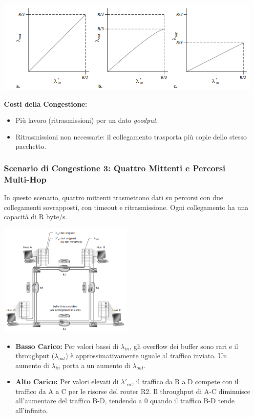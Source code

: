 \begin{center}
  \includegraphics[width=\textwidth]{img/scenario2diag.png}
\end{center}

\textbf{Costi della Congestione:}
\begin{itemize}
    \item Più lavoro (ritrasmissioni) per un dato \textit{goodput}.
    \item Ritrasmissioni non necessarie: il collegamento trasporta più copie dello stesso pacchetto.
\end{itemize}

\subsubsection*{Scenario di Congestione 3: Quattro Mittenti e Percorsi Multi-Hop}
In questo scenario, quattro mittenti trasmettono dati su percorsi con due collegamenti sovrapposti, con timeout e ritrasmissione. Ogni collegamento ha una capacità di R byte/s.

\begin{center}
  \includegraphics[width=0.5\textwidth]{img/scenario3.png}
\end{center}

\begin{itemize}
    \item \textbf{Basso Carico:} Per valori bassi di \(\lambda_{in}\), gli overflow dei buffer sono rari e il throughput (\(\lambda_{out}\)) è approssimativamente uguale al traffico inviato. Un aumento di \(\lambda_{in}\) porta a un aumento di \(\lambda_{out}\).
    \item \textbf{Alto Carico:} Per valori elevati di \(\lambda'_{in}\), il traffico da B a D compete con il traffico da A a C per le risorse del router R2. Il throughput di A-C diminuisce all'aumentare del traffico B-D, tendendo a 0 quando il traffico B-D tende all'infinito.
\end{itemize}

